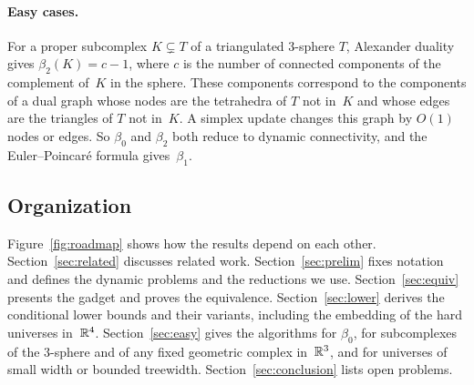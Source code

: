 \paragraph{Easy cases.}
For a proper subcomplex $K\subsetneq T$ of a triangulated $3$-sphere $T$, Alexander duality gives $\beta_2(K)=c-1$, where $c$ is the number of connected components of the complement of~$K$ in the sphere.
These components correspond to the components of a dual graph whose nodes are the tetrahedra of $T$ not in~$K$ and whose edges are the triangles of $T$ not in~$K$.
A simplex update changes this graph by $O(1)$ nodes or edges.
So $\beta_0$ and $\beta_2$ both reduce to dynamic connectivity, and the Euler--Poincar\'e formula gives~$\beta_1$.

\subsection{Organization}

Figure~\ref{fig:roadmap} shows how the results depend on each other.
Section~\ref{sec:related} discusses related work.
Section~\ref{sec:prelim} fixes notation and defines the dynamic problems and the reductions we use.
Section~\ref{sec:equiv} presents the gadget and proves the equivalence.
Section~\ref{sec:lower} derives the conditional lower bounds and their variants, including the embedding of the hard universes in~$\mathbb{R}^4$.
Section~\ref{sec:easy} gives the algorithms for $\beta_0$, for subcomplexes of the $3$-sphere and of any fixed geometric complex in~$\mathbb{R}^3$, and for universes of small width or bounded treewidth.
Section~\ref{sec:conclusion} lists open problems.
